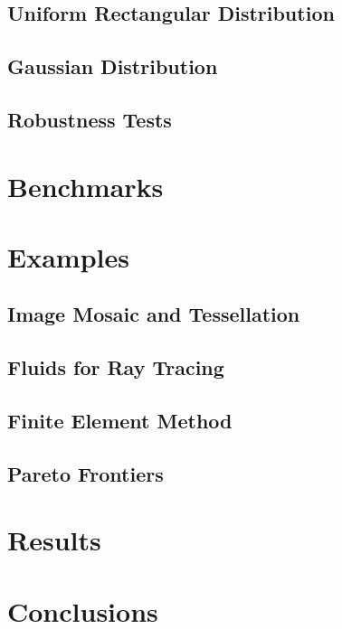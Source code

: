 \documentclass[10pt, twoside, fleqn]{article}
\let\oldsection\section
\renewcommand*\section{%
  \cleardoublepage
  \thispagestyle{sectionstyle}\oldsection}
\begin{document}
    \subsection{Uniform Rectangular Distribution}
    \subsection{Gaussian Distribution}
    \subsection{Robustness Tests}
  \section{Benchmarks}
  \section{Examples}
    \subsection{Image Mosaic and Tessellation}
    \subsection{Fluids for Ray Tracing}
    \subsection{Finite Element Method}
    \subsection{Pareto Frontiers}
  \section{Results}
  \section{Conclusions}

  \nocite{*}
  \printbibliography[heading=bibintoc]
\end{document}
